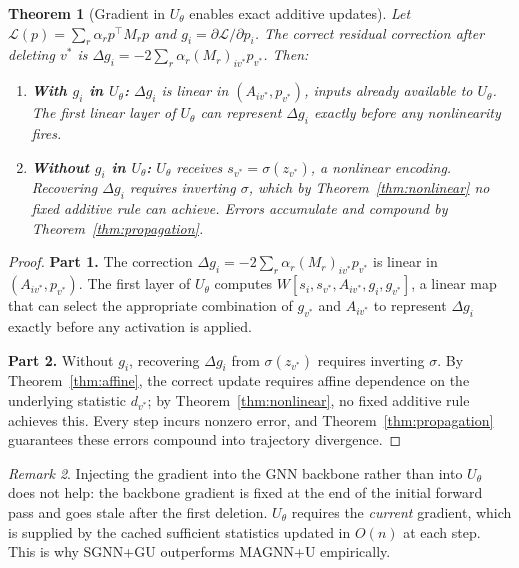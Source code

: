 \documentclass[11pt]{article}
\theoremstyle{plain}
\newtheorem{theorem}{Theorem}[section]
\theoremstyle{remark}
\newtheorem{remark}[theorem]{Remark}
\begin{document}
\begin{theorem}[Gradient in $U_\theta$ enables exact additive updates]
  \label{thm:rectification}
  Let $\mathcal{L}(p) = \sum_r\alpha_r p^\top M_r p$ and
  $g_i = \partial\mathcal{L}/\partial p_i$. The correct residual correction after
  deleting $v^*$ is $\Delta g_i = -2\sum_r\alpha_r(M_r)_{iv^*}p_{v^*}$. Then:
  \begin{enumerate}
    \item \textbf{With $g_i$ in $U_\theta$:} $\Delta g_i$ is linear in
      $(A_{iv^*}, p_{v^*})$, inputs already available to $U_\theta$. The first linear
      layer of $U_\theta$ can represent $\Delta g_i$ exactly before any nonlinearity
      fires.
    \item \textbf{Without $g_i$ in $U_\theta$:} $U_\theta$ receives
      $s_{v^*}=\sigma(z_{v^*})$, a nonlinear encoding. Recovering $\Delta g_i$
      requires inverting $\sigma$, which by Theorem~\ref{thm:nonlinear} no fixed
      additive rule can achieve. Errors accumulate and compound by
      Theorem~\ref{thm:propagation}.
  \end{enumerate}
\end{theorem}
\begin{proof}
  \textbf{Part 1.} The correction $\Delta g_i = -2\sum_r\alpha_r(M_r)_{iv^*}p_{v^*}$
  is linear in $(A_{iv^*}, p_{v^*})$. The first layer of $U_\theta$ computes
  $W[s_i, s_{v^*}, A_{iv^*}, g_i, g_{v^*}]$, a linear map that can select the
  appropriate combination of $g_{v^*}$ and $A_{iv^*}$ to represent $\Delta g_i$
  exactly before any activation is applied.

  \textbf{Part 2.} Without $g_i$, recovering $\Delta g_i$ from $\sigma(z_{v^*})$
  requires inverting $\sigma$. By Theorem~\ref{thm:affine}, the correct update
  requires affine dependence on the underlying statistic $d_{v^*}$; by
  Theorem~\ref{thm:nonlinear}, no fixed additive rule achieves this. Every step
  incurs nonzero error, and Theorem~\ref{thm:propagation} guarantees these errors
  compound into trajectory divergence.
\end{proof}

\begin{remark}
  Injecting the gradient into the GNN backbone rather than into $U_\theta$ does not
  help: the backbone gradient is fixed at the end of the initial forward pass and goes
  stale after the first deletion. $U_\theta$ requires the \emph{current} gradient,
  which is supplied by the cached sufficient statistics updated in $O(n)$ at each step.
  This is why SGNN+GU outperforms MAGNN+U empirically.
\end{remark}
\end{document}
